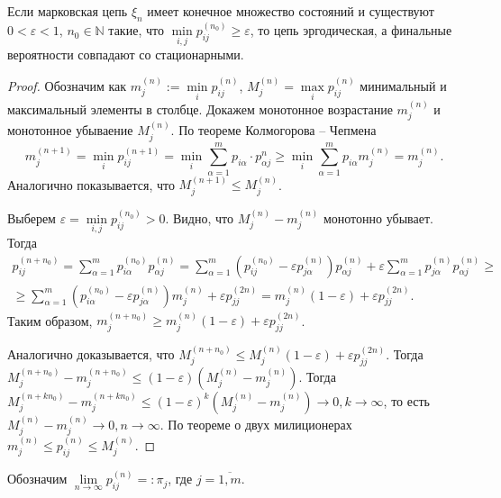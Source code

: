 \begin{theorem}
  Если марковская цепь $\xi_n$ имеет конечное множество состояний и существуют $0
  <\varepsilon < 1$,
  $n_0 \in \mathbb N$ такие, что $\min\limits_{i, j} p_{ij}^{(n_0)} \geqslant
  \varepsilon$, то цепь эргодическая, а
  финальные вероятности совпадают со стационарными.
\end{theorem}
\begin{proof}
  Обозначим как $m_j^{(n)} := \min\limits_i p_{ij}^{(n)}$, $M_j^{(n)} = \max\limits_i p_{ij}^{(n)}$ минимальный 
  и максимальный элементы в столбце. Докажем монотонное возрастание $m_{j}^{(n)}$ и монотонное
  убываение $M_j^{(n)}$. По теореме Колмогорова -- Чепмена
  \[
    m_{j}^{(n+1)} = \min_i p_{ij}^{(n+1)}
    = \min_i \sum_{\alpha=1}^m p_{i\alpha} \cdot p_{\alpha j}^{n} \geqslant 
    \min_i \sum_{\alpha=1}^m p_{i \alpha} m_j^{(n)}
    = m_j^{(n)}.
  \]
  Аналогично показывается, что $M_{j}^{(n+1)} \leqslant M_j^{(n)}$.

  Выберем $\varepsilon = \min\limits_{i, j} p_{ij}^{(n_0)} > 0$.
  Видно, что $M_j^{(n)}-m_j^{(n)}$ монотонно убывает. Тогда
  \begin{multline*}
    p_{ij}^{(n+n_0)} = \sum_{\alpha=1}^m p_{i\alpha}^{(n_0)} p_{\alpha j}^{(n)}
    = \sum_{\alpha=1}^m (p_{ij}^{(n_0)} - \varepsilon p_{j \alpha}^{(n)}) p_{\alpha j}^{(n)}
      + \varepsilon \sum_{\alpha=1}^m p_{j \alpha}^{(n)} p_{\alpha j}^{(n)} \geqslant \\
    \geqslant \sum_{\alpha=1}^m (p_{i\alpha}^{(n_0)} - \varepsilon p_{j\alpha}^{(n)}) m_j^{(n)}
      + \varepsilon p_{jj}^{(2n)}
    = m_j^{(n)} (1-\varepsilon) + \varepsilon p_{jj}^{(2n)}.
  \end{multline*}
  Таким образом, $m_j^{(n+n_0)} \geqslant m_j^{(n)} (1-\varepsilon) + \varepsilon p_{jj}^{(2n)}$.
  
  Аналогично доказывается, что $M_j^{(n+n_0)} \leqslant M_j^{(n)}
  (1-\varepsilon) + \varepsilon p_{jj}^{(2n)}$.
  Тогда $M_{j}^{(n+n_0)} - m_j^{(n+n_0)} \leqslant (1-\varepsilon) (M_j^{(n)} - m_j^{(n)})$. 
  Тогда $M_j^{(n+kn_0)} - m_j^{(n+kn_0)} \leqslant (1-\varepsilon)^k (M_j^{(n)} - m_j^{(n)}) \to 0, k\to \infty$, то есть $M_{j}^{(n)} - m_j^{(n)} \to 0, n \to \infty$. По теореме о двух милиционерах
  $m_j^{(n)} \leqslant p_{ij}^{(n)} \leqslant M_j^{(n)}$.
\end{proof}

Обозначим $\lim\limits_{n\to\infty} p_{ij}^{(n)} =: \pi_j$, где $j = \overline{1, m}$. 

